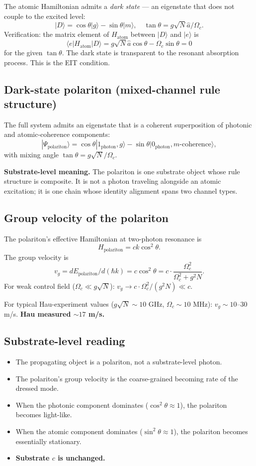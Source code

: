 \documentclass[11pt,a4paper]{article}
\begin{document}
The atomic Hamiltonian admits a \emph{dark state} --- an eigenstate that does not couple to the excited level:
\[
|D\rangle = \cos\theta|g\rangle - \sin\theta|m\rangle, \quad \tan\theta = g\sqrt N\hat a/\Omega_c.
\]
Verification: the matrix element of $H_{\mathrm{atom}}$ between $|D\rangle$ and $|e\rangle$ is
\[
\langle e|H_{\mathrm{atom}}|D\rangle = g\sqrt N\hat a\cos\theta - \Omega_c\sin\theta = 0
\]
for the given $\tan\theta$. The dark state is transparent to the resonant absorption process. This is the EIT condition.

\subsection{Dark-state polariton (mixed-channel rule structure)}

The full system admits an eigenstate that is a coherent superposition of photonic and atomic-coherence components:
\[
|\Psi_{\mathrm{polariton}}\rangle = \cos\theta|1_{\mathrm{photon}}, g\rangle - \sin\theta|0_{\mathrm{photon}}, m\text{-coherence}\rangle,
\]
with mixing angle $\tan\theta = g\sqrt N/\Omega_c$.

\textbf{Substrate-level meaning.} The polariton is one substrate object whose rule structure is composite. It is not a photon traveling alongside an atomic excitation; it is one chain whose identity alignment spans two channel types.

\subsection{Group velocity of the polariton}

The polariton's effective Hamiltonian at two-photon resonance is
\[
H_{\mathrm{polariton}} = c k\cos^2\theta.
\]
The group velocity is
\[
v_g = dE_{\mathrm{polariton}}/d(\hbar k) = c\cos^2\theta = c\cdot\frac{\Omega_c^2}{\Omega_c^2 + g^2 N}.
\]
For weak control field ($\Omega_c \ll g\sqrt N$): $v_g \to c\cdot\Omega_c^2/(g^2 N) \ll c$.

For typical Hau-experiment values ($g\sqrt N \sim 10$ GHz, $\Omega_c \sim 10$ MHz): $v_g \sim 10$--30 m/s. \textbf{Hau measured $\sim 17$ m/s.}

\subsection{Substrate-level reading}

\begin{itemize}[noitemsep]
  \item The propagating object is a polariton, not a substrate-level photon.
  \item The polariton's group velocity is the coarse-grained becoming rate of the dressed mode.
  \item When the photonic component dominates ($\cos^2\theta \approx 1$), the polariton becomes light-like.
  \item When the atomic component dominates ($\sin^2\theta \approx 1$), the polariton becomes essentially stationary.
  \item \textbf{Substrate $c$ is unchanged.}
\end{itemize}
\end{document}
